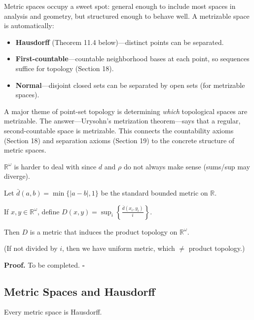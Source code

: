 \documentclass[11pt]{report}
\renewenvironment{proof}[1][Proof]{\noindent\textbf{#1.} }{\hfill$\square$\par\vspace{5pt}}
\begin{document}
\begin{rembox}
Metric spaces occupy a sweet spot: general enough to include most spaces in analysis and geometry, but structured enough to behave well. A metrizable space is automatically:
\begin{itemize}
    \item \textbf{Hausdorff} (Theorem 11.4 below)---distinct points can be separated.
    \item \textbf{First-countable}---countable neighborhood bases at each point, so sequences suffice for topology (Section 18).
    \item \textbf{Normal}---disjoint closed sets can be separated by open sets (for metrizable spaces).
\end{itemize}
A major theme of point-set topology is determining \emph{which} topological spaces are metrizable. The answer---Urysohn's metrization theorem---says that a regular, second-countable space is metrizable. This connects the countability axioms (Section 18) and separation axioms (Section 19) to the concrete structure of metric spaces.
\end{rembox}

\begin{rembox}
$\mathbb{R}^\omega$ is harder to deal with since $d$ and $\rho$ do not always make sense (sums/sup may diverge).
\end{rembox}

\begin{thmbox}
Let $\bar{d}(a, b) = \min\{|a - b|, 1\}$ be the standard bounded metric on $\mathbb{R}$.

If $x, y \in \mathbb{R}^\omega$, define $D(x, y) = \sup_i\left\{\frac{\bar{d}(x_i, y_i)}{i}\right\}$.

Then $D$ is a metric that induces the product topology on $\mathbb{R}^\omega$.

(If not divided by $i$, then we have uniform metric, which $\neq$ product topology.)
\end{thmbox}

\begin{proof}
To be completed.
\end{proof}

\subsection{Metric Spaces and Hausdorff}

\begin{thmbox}
Every metric space is Hausdorff.
\end{thmbox}
\end{document}
